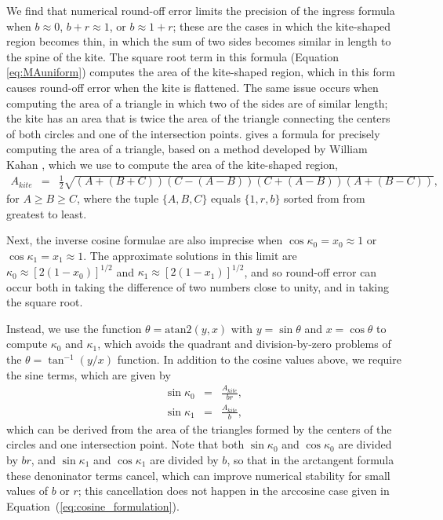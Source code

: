 \documentclass[modern]{aastex61}
\begin{document}
We find that numerical round-off error limits the precision of the ingress formula when
$b \approx 0$, $b+r \approx 1$, or $b \approx 1+r$;  these are the cases in which
the kite-shaped region becomes thin, in which the sum of two sides becomes similar
in length to the spine of the kite.  The square root term in this formula (Equation
\ref{eq:MAuniform}) computes the area of the kite-shaped region, which in this
form causes round-off error when the kite is flattened.  The same issue occurs when
computing the area of a triangle in which two of the sides are of similar length;
the kite has an area that is twice the area of the triangle connecting the centers
of both circles and one of the intersection points.  \cite{Goldberg1991} gives a
formula for precisely computing the area of a triangle, based on a method developed
by William Kahan \citep[later described in][]{Kahan2000}, which we use to compute 
the area of the kite-shaped region,
\begin{eqnarray}\label{eq:Kite_area}
A_{kite} &=& \frac{1}{2}\sqrt{(A+(B+C))(C-(A-B))(C+(A-B))(A+(B-C))},
\end{eqnarray}
for $A \ge B \ge C$, where the tuple $\{A,B,C\}$ equals $\{1,r,b\}$ 
sorted from from greatest to least. 

Next, the inverse cosine formulae are also imprecise when $\cos{\kappa_0} = x_0 \approx
1$ or $\cos{\kappa_1} = x_1 \approx 1$.  The approximate solutions in this limit
are $\kappa_0 \approx [2(1-x_0)]^{1/2}$ and $\kappa_1 \approx [2(1-x_1)]^{1/2}$, and so round-off
error can occur both in taking the difference of two numbers close to unity,
and in taking the square root.

Instead, we use the function $\theta = \mathrm{atan2}(y,x)$ with $y=\sin{\theta}$ and
$x=\cos{\theta}$ to compute $\kappa_0$ and $\kappa_1$, which avoids the quadrant and
division-by-zero problems of the $\theta = \tan^{-1}(y/x)$ function.  In addition
to the cosine values above, we require the sine terms, which are given by
\begin{eqnarray}
\sin{\kappa_0} &=& \frac{A_{kite}}{br},\nonumber\\
\sin{\kappa_1} &=& \frac{A_{kite}}{b},
\end{eqnarray}
which can be derived from the area of the triangles formed by the centers of
the circles and one intersection point.
Note that both $\sin{\kappa_0}$ and $\cos{\kappa_0}$ are divided by $br$, and
$\sin{\kappa_1}$ and $\cos{\kappa_1}$ are divided by $b$, so that
in the arctangent formula these denoninator terms cancel, which can improve
numerical stability for small values of $b$ or $r$; this cancellation does not happen
in the arccosine case given in Equation~(\ref{eq:cosine_formulation}).
\end{document}
